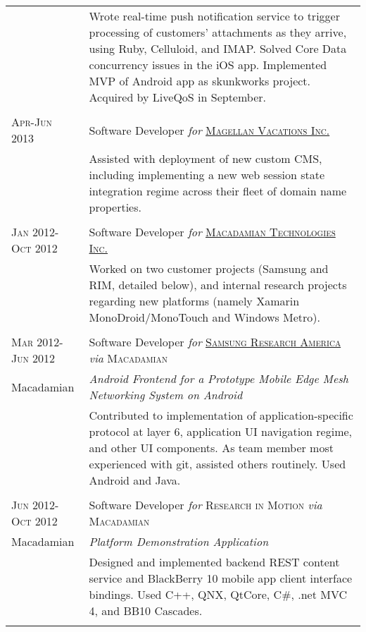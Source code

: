 \documentclass[letterpaper,10pt]{article}
\begin{document}
\begin{longtable}{p{3cm}|p{12cm}}
   & \footnotesize{Wrote real-time push notification service to trigger processing of customers' attachments as they arrive, using Ruby, Celluloid, and IMAP.  Solved Core Data concurrency issues in the iOS app.  Implemented MVP of Android app as skunkworks project.  Acquired by LiveQoS in September.} \\
\multicolumn{2}{c}{} \\
  \textsc{Apr-Jun 2013} & Software Developer \emph{for} \href{http://www.magellanvacations.com/}{\textsc{Magellan Vacations Inc.}} \\
   & \footnotesize{Assisted with deployment of new custom CMS, including implementing a new web session state integration regime across their fleet of domain name properties.} \\
\multicolumn{2}{c}{} \\
  \textsc{Jan 2012-Oct 2012} & Software Developer \emph{for} \href{http://www.macadamian.com/}{\textsc{Macadamian Technologies Inc.}} \\
   & \footnotesize{Worked on two customer projects (Samsung and RIM, detailed below), and internal research projects regarding new platforms (namely Xamarin MonoDroid/MonoTouch and Windows Metro).} \\
\multicolumn{2}{c}{} \\
  \textsc{Mar 2012-Jun 2012} & Software Developer \emph{for} \href{http://www.sisa.samsung.com/}{\textsc{Samsung Research America}} \emph{via} \textsc{Macadamian} \\
  \tiny{Macadamian} & \emph{Android Frontend for a Prototype Mobile Edge Mesh Networking System on Android} \\
   & \footnotesize{Contributed to implementation of application-specific protocol at layer 6, application UI navigation regime, and other UI components.  As team member most experienced with git, assisted others routinely.  Used Android and Java.} \\
\multicolumn{2}{c}{} \\
  \textsc{Jun 2012-Oct 2012} & Software Developer \emph{for} \textsc{Research in Motion} \emph{via} \textsc{Macadamian} \\
  \tiny{Macadamian} & \emph{Platform Demonstration Application} \\
   & \footnotesize{Designed and implemented backend REST content service and BlackBerry 10 mobile app client interface bindings.  Used C++, QNX, QtCore, C\#, .net MVC 4, and BB10 Cascades.} \\
\multicolumn{2}{c}{} \\

\end{longtable}
\end{document}
